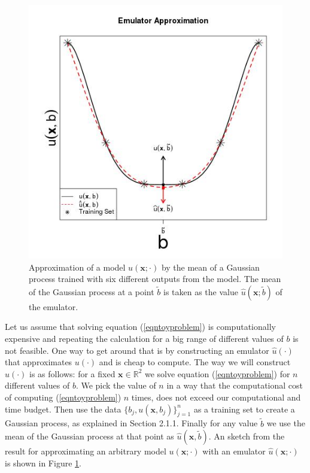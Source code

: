 \documentclass{sfuthesis}
\newcommand{\x}{\textbf{x}}
\begin{document}
\begin{figure}[H]
\centering
\includegraphics[scale=0.55]{./FigChap3/emulatorApproximation}
\caption{Approximation of a model $u(\x;\cdot)$ by the mean of a Gaussian process trained
with six  different  outputs from the model. The mean of the Gaussian process at a point $\tilde{b}$ is taken
as the value $\widehat{u}(\x;\tilde{b})$ of the emulator.}
\label{figGPCreation}
\end{figure}

 
Let us assume that solving
equation (\ref{eqntoyproblem}) is computationally expensive and repeating the calculation for a big range of 
different values of $b$
is not feasible. One way to get around that is by constructing an emulator $\widehat{u}(\cdot)$ that approximates $u(\cdot)$
and is cheap to compute. 
The way we will construct $\widehat{u}(\cdot)$ is as follows: for a fixed $\x\in\mathbb{R}^{2}$ we solve equation 
(\ref{eqntoyproblem}) for   $n$  different values of  $b$. We pick the value of $n$ in a way
that the computational cost of computing (\ref{eqntoyproblem}) $n$ times, does not exceed our
computational and time budget. Then use the data $\{b_{j},u(\x,b_{j})\}_{j=1}^{n}$  as a 
training set to create a Gaussian process, as explained in  Section 2.1.1. Finally
for any value $\tilde{b}$ we use the mean of the Gaussian process at that point as $\widehat{u}(\x,\tilde{b})$.
An sketch from the result for approximating an arbitrary model $u(\x;\cdot)$ with an emulator
$\widehat{u}(\x;\cdot)$ is shown
in Figure \ref{figGPCreation}.
\end{document}
